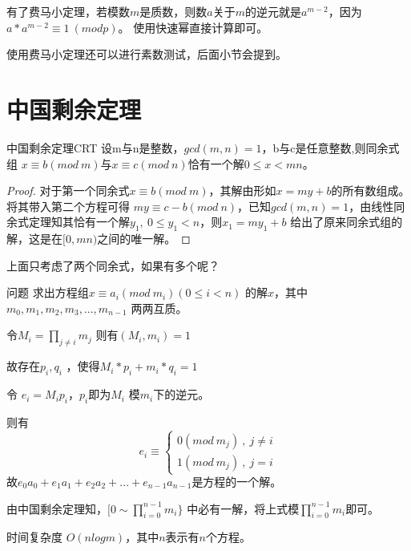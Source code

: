 \vbox{}

有了费马小定理，若模数$m$是质数，则数$a$关于$m$的逆元就是$a^{m-2}$，因为$a* a^{m-2} \equiv 1 \ (mod p)$。
使用快速幂直接计算即可。

\vbox{}

{\heiti 使用费马小定理还可以进行素数测试}，后面小节会提到。

\section{中国剩余定理}

\begin{theorem}{中国剩余定理}{CRT}
	设m与n是整数，$gcd(m,n)=1$，b与c是任意整数,则同余式组
	$x\equiv b(mod\ m)$与$x\equiv c(mod\ n)$恰有一个解$0\leqslant x<mn$。
\end{theorem}

\begin{proof}
	对于第一个同余式$x\equiv b(mod\ m)$，其解由形如$x = my +b$的所有数组成。将其带入第二个方程可得
	$my\equiv c-b (mod\ n)$，已知$gcd(m,n)=1$，由线性同余式定理知其恰有一个解$y_1,\ 0\le y_1<n$，则$x_1=my_1+b$
	给出了原来同余式组的解，这是在$[0,mn)$之间的唯一解。
\end{proof}

\vbox{}

上面只考虑了两个同余式，如果有多个呢？

\begin{custom}{问题}
	求出方程组$x\equiv a_i(mod \ m_i) (0 \leqslant i <n) $ 的解$x$，其中$m_0,m_1,m_2,m_3,...,m_{n-1}$ 两两互质。
\end{custom}

\begin{solution}
	令$M_i=\prod_{j\neq i}m_j$     则有$(M_i,m_i)=1$   
	
	故存在$p_i,q_i$ ，使得$M_i*p_i+m_i*q_i=1$ 
	
	令  $e_i=M_ip_i$，\quad    $p_i$即为$M_i$ 模$m_i$下的逆元。   
	
	则有
$$
e_i\equiv\left\{\begin{matrix}
0(mod\ m_j)\ ,\ j\neq i\\ 
1(mod\ m_j)\ ,\ j=i
\end{matrix}\right.	
$$	
	故$e_0a_0+e_1a_1+e_2a_2+...+e_{n-1}a_{n-1}$是方程的一个解。
	
	由中国剩余定理知，$[0\sim\prod_{i=0}^{n-1}m_i\}$ 中必有一解，将上式模$\prod_{i=0}^{n-1}m_i$即可。 
\end{solution}

时间复杂度  $O(nlogm)$，其中$n$表示有$n$个方程。

